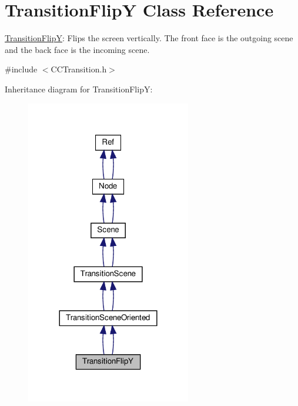 \hypertarget{classTransitionFlipY}{}\section{Transition\+FlipY Class Reference}
\label{classTransitionFlipY}


\hyperlink{classTransitionFlipY}{Transition\+FlipY}\+: Flips the screen vertically. The front face is the outgoing scene and the back face is the incoming scene.  




{\ttfamily \#include $<$C\+C\+Transition.\+h$>$}



Inheritance diagram for Transition\+FlipY\+:
\nopagebreak
\begin{figure}[H]
\begin{center}
\leavevmode
\includegraphics[width=204pt]{classTransitionFlipY__inherit__graph}
\end{center}
\end{figure}


